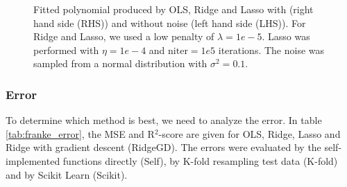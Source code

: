 \begin{figure} [H]
    \caption{Fitted polynomial produced by OLS, Ridge and Lasso with (right hand side (RHS)) and without noise (left hand side (LHS)). For Ridge and Lasso, we used a low penalty of $\lambda=1e-5$. Lasso was performed with $\eta=1e-4$ and $\text{niter}=1e5$ iterations. The noise was sampled from a normal distribution with $\sigma^2=0.1$.}%
    \label{fig:franke_plots}%
\end{figure}
\restoregeometry


\subsubsection{Error}
To determine which method is best, we need to analyze the error. In table \eqref{tab:franke_error}, the MSE and R$^2$-score are given for OLS, Ridge, Lasso and Ridge with gradient descent (RidgeGD). The errors were evaluated by the self-implemented functions directly (Self), by K-fold resampling test data (K-fold) and by Scikit Learn (Scikit). 

